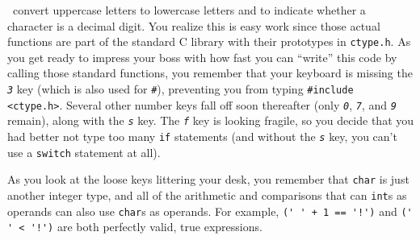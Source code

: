 \transitionone\ convert uppercase letters to lowercase letters and to indicate whether a character is a decimal digit.
You realize this is easy work since those actual functions are part of the standard C library with their prototypes in \texttt{ctype.h}.
As you get ready to impress your boss with how fast you can ``write'' this code by calling those standard functions, you remember that your keyboard is missing the \textit{\texttt{3}} key (which is also used for \textit{\texttt{\#}}), preventing you from typing \lstinline{#include <ctype.h>}.
Several other number keys fall off soon thereafter (only \textit{\texttt{0}}, \textit{\texttt{7}}, and \textit{\texttt{9}} remain), along with the \textit{\texttt{s}} key.
The \textit{\texttt{f}} key is looking fragile, so you decide that you had better not type too many \lstinline{if} statements (and without the \textit{\texttt{s}} key, you can't use a \lstinline{switch} statement at all).

As you look at the loose keys littering your desk, you remember that \lstinline{char} is just another integer type,
and all of the arithmetic and comparisons that can \lstinline{int}s as operands can also use \lstinline{char}s as operands.
For example, \lstinline{(' ' + 1 == '!')} and \lstinline{(' ' < '!')} are both perfectly valid, true expressions.

\begin{description}
\end{description}

